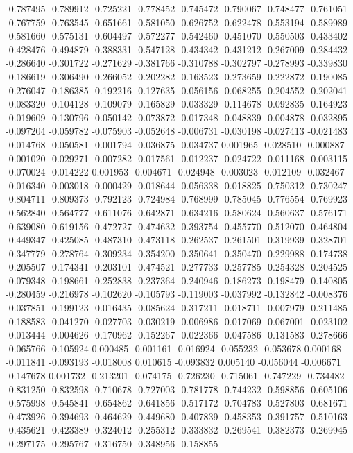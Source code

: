 -0.787495
-0.789912
-0.725221
-0.778452
-0.745472
-0.790067
-0.748477
-0.761051
-0.767759
-0.763545
-0.651661
-0.581050
-0.626752
-0.622478
-0.553194
-0.589989
-0.581660
-0.575131
-0.604497
-0.572277
-0.542460
-0.451070
-0.550503
-0.433402
-0.428476
-0.494879
-0.388331
-0.547128
-0.434342
-0.431212
-0.267009
-0.284432
-0.286640
-0.301722
-0.271629
-0.381766
-0.310788
-0.302797
-0.278993
-0.339830
-0.186619
-0.306490
-0.266052
-0.202282
-0.163523
-0.273659
-0.222872
-0.190085
-0.276047
-0.186385
-0.192216
-0.127635
-0.056156
-0.068255
-0.204552
-0.202041
-0.083320
-0.104128
-0.109079
-0.165829
-0.033329
-0.114678
-0.092835
-0.164923
-0.019609
-0.130796
-0.050142
-0.073872
-0.017348
-0.048839
-0.004878
-0.032895
-0.097204
-0.059782
-0.075903
-0.052648
-0.006731
-0.030198
-0.027413
-0.021483
-0.014768
-0.050581
-0.001794
-0.036875
-0.034737
0.001965
-0.028510
-0.000887
-0.001020
-0.029271
-0.007282
-0.017561
-0.012237
-0.024722
-0.011168
-0.003115
-0.070024
-0.014222
0.001953
-0.004671
-0.024948
-0.003023
-0.012109
-0.032467
-0.016340
-0.003018
-0.000429
-0.018644
-0.056338
-0.018825
-0.750312
-0.730247
-0.804711
-0.809373
-0.792123
-0.724984
-0.768999
-0.785045
-0.776554
-0.769923
-0.562840
-0.564777
-0.611076
-0.642871
-0.634216
-0.580624
-0.560637
-0.576171
-0.639080
-0.619156
-0.472727
-0.474632
-0.393754
-0.455770
-0.512070
-0.464804
-0.449347
-0.425085
-0.487310
-0.473118
-0.262537
-0.261501
-0.319939
-0.328701
-0.347779
-0.278764
-0.309234
-0.354200
-0.350641
-0.350470
-0.229988
-0.174738
-0.205507
-0.174341
-0.203101
-0.474521
-0.277733
-0.257785
-0.254328
-0.204525
-0.079348
-0.198661
-0.252838
-0.237364
-0.240946
-0.186273
-0.198479
-0.140805
-0.280459
-0.216978
-0.102620
-0.105793
-0.119003
-0.037992
-0.132842
-0.008376
-0.037851
-0.199123
-0.016435
-0.085624
-0.317211
-0.018711
-0.007979
-0.211485
-0.188583
-0.041270
-0.027703
-0.030219
-0.006986
-0.017069
-0.067001
-0.023102
-0.013444
-0.004626
-0.170962
-0.152267
-0.022366
-0.047586
-0.131583
-0.278666
-0.065766
-0.105924
0.000485
-0.001161
-0.016924
-0.055232
-0.053678
0.000168
-0.011841
-0.093193
-0.018008
0.010615
-0.093832
0.005140
-0.056044
-0.006671
-0.147678
0.001732
-0.213201
-0.074175
-0.726230
-0.715061
-0.747229
-0.734482
-0.831250
-0.832598
-0.710678
-0.727003
-0.781778
-0.744232
-0.598856
-0.605106
-0.575998
-0.545841
-0.654862
-0.641856
-0.517172
-0.704783
-0.527803
-0.681671
-0.473926
-0.394693
-0.464629
-0.449680
-0.407839
-0.458353
-0.391757
-0.510163
-0.435621
-0.423389
-0.324012
-0.255312
-0.333832
-0.269541
-0.382373
-0.269945
-0.297175
-0.295767
-0.316750
-0.348956
-0.158855
